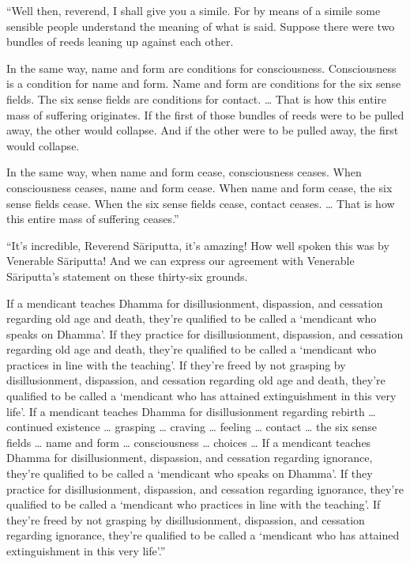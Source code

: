 \documentclass[12pt,openany]{book}%
\begin{document}
“Well then, reverend, I shall give you a simile. For by means of a simile some sensible people understand the meaning of what is said. Suppose there were two bundles of reeds leaning up against each other. 

In the same way, name and form are conditions for consciousness. Consciousness is a condition for name and form. Name and form are conditions for the six sense fields. The six sense fields are conditions for contact. … That is how this entire mass of suffering originates. If the first of those bundles of reeds were to be pulled away, the other would collapse. And if the other were to be pulled away, the first would collapse. 

In the same way, when name and form cease, consciousness ceases. When consciousness ceases, name and form cease. When name and form cease, the six sense fields cease. When the six sense fields cease, contact ceases. … That is how this entire mass of suffering ceases.” 

“It’s incredible, Reverend \textsanskrit{Sāriputta}, it’s amazing! How well spoken this was by Venerable \textsanskrit{Sāriputta}! And we can express our agreement with Venerable \textsanskrit{Sāriputta}’s statement on these thirty-six grounds. 

If a mendicant teaches Dhamma for disillusionment, dispassion, and cessation regarding old age and death, they’re qualified to be called a ‘mendicant who speaks on Dhamma’. If they practice for disillusionment, dispassion, and cessation regarding old age and death, they’re qualified to be called a ‘mendicant who practices in line with the teaching’. If they’re freed by not grasping by disillusionment, dispassion, and cessation regarding old age and death, they’re qualified to be called a ‘mendicant who has attained extinguishment in this very life’. If a mendicant teaches Dhamma for disillusionment regarding rebirth … continued existence … grasping … craving … feeling … contact … the six sense fields … name and form … consciousness … choices … If a mendicant teaches Dhamma for disillusionment, dispassion, and cessation regarding ignorance, they’re qualified to be called a ‘mendicant who speaks on Dhamma’. If they practice for disillusionment, dispassion, and cessation regarding ignorance, they’re qualified to be called a ‘mendicant who practices in line with the teaching’. If they’re freed by not grasping by disillusionment, dispassion, and cessation regarding ignorance, they’re qualified to be called a ‘mendicant who has attained extinguishment in this very life’.” 
\end{document}
